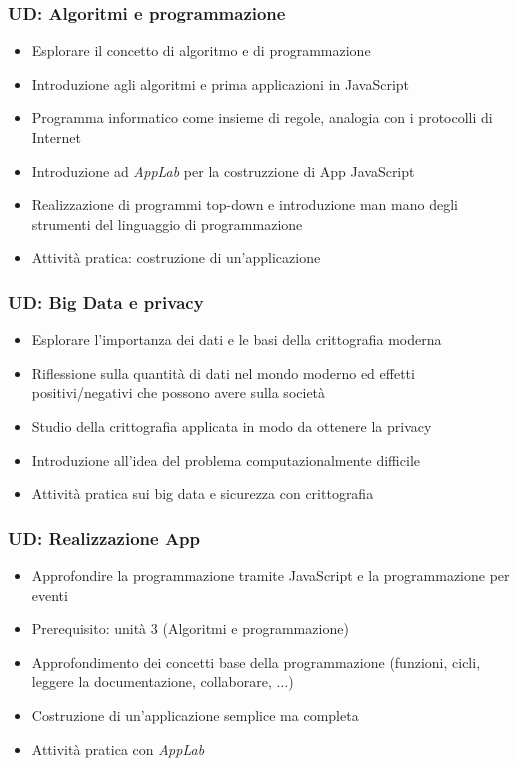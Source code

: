 \documentclass{beamer}
\begin{document}
\begin{frame}
  \frametitle{UD: Algoritmi e programmazione}

  \begin{itemize}
    \item Esplorare il concetto di algoritmo e di programmazione
    \item Introduzione agli algoritmi e prima applicazioni in JavaScript
    \item Programma informatico come insieme di regole, analogia con i protocolli di Internet
    \item Introduzione ad \emph{AppLab} per la costruzzione di App JavaScript
    \item Realizzazione di programmi top-down e introduzione man mano degli strumenti del linguaggio di programmazione
    \item Attività pratica: costruzione di un'applicazione
  \end{itemize}
\end{frame}

\begin{frame}
  \frametitle{UD: Big Data e privacy}

  \begin{itemize}
    \item Esplorare l'importanza dei dati e le basi della crittografia moderna
    \item Riflessione sulla quantità di dati nel mondo moderno ed effetti positivi/negativi che possono avere sulla società
    \item Studio della crittografia applicata in modo da ottenere la privacy
    \item Introduzione all'idea del problema computazionalmente difficile
    \item Attività pratica sui big data e sicurezza con crittografia
  \end{itemize}
\end{frame}

\begin{frame}
  \frametitle{UD: Realizzazione App}

  \begin{itemize}
    \item Approfondire la programmazione tramite JavaScript e la programmazione per eventi
    \item Prerequisito: unità 3 (Algoritmi e programmazione)
    \item Approfondimento dei concetti base della programmazione (funzioni, cicli, leggere la documentazione, collaborare, ...)
    \item Costruzione di un'applicazione semplice ma completa
    \item Attività pratica con \emph{AppLab}
  \end{itemize}
\end{frame}
\end{document}
